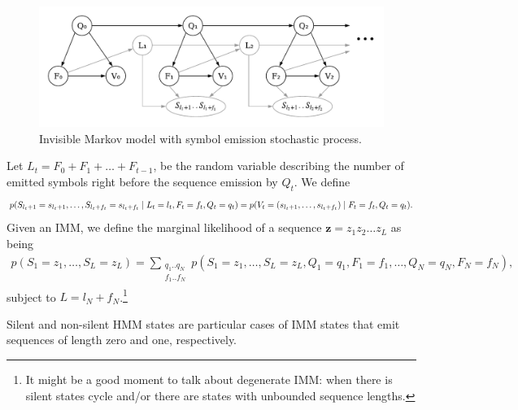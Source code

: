 \begin{figure}[htbp]
\centering
\includegraphics[width=.6\linewidth]{figure/imm-s}
\caption{Invisible Markov model with symbol emission stochastic process.}%
\label{fig:imm-s}
\end{figure}

Let $L_t=F_0+F_1+\dots + F_{t-1}$, be the random variable describing the number of emitted symbols right
before the sequence emission by $Q_t$.
We define
\begin{align*}
    p(S_{l_t+1}=s_{l_t+1}, \dots, S_{l_t+f_t}=s_{l_t+f_t} \;|\; L_t=l_t, F_t=f_t, Q_t=q_t) =
                                p(V_t=(s_{l_t+1}, \dots, s_{l_t+f_t}) \;|\; F_t=f_t, Q_t=q_t).
\end{align*}
Given an IMM, we define the marginal likelihood of a sequence $\mathbf z = z_1z_2\dots z_L$
as being
\begin{align*}
    p(S_1=z_1, \dots, S_L=z_L) = \sum\limits_{\substack{q_1..q_N \\ f_1..f_N}}
        p(S_1=z_1, \dots, S_L=z_L, Q_1=q_1, F_1=f_1, \dots, Q_N=q_N, F_N=f_N),
\end{align*}
subject to $L=l_N+f_N$.\footnote{It might be a good moment to talk about degenerate IMM: when there is silent states cycle and/or
there are states with unbounded sequence lengths.}

Silent and non-silent HMM states are particular cases of IMM states that emit sequences of length zero and one,
respectively.





